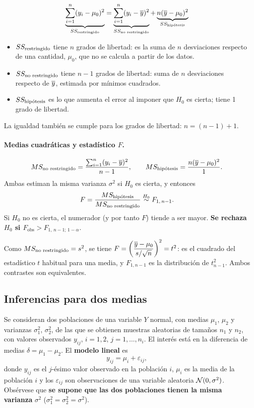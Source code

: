\begin{proposicion}
  \[
    \underbrace{\sum_{i=1}^{n} (y_i-\mu_0)^2}_{SS_{\text{restringido}}}
    = \underbrace{\sum_{i=1}^{n} (y_i-\overline{y})^2}_{SS_{\text{no restringido}}}
    + \underbrace{n(\overline{y}-\mu_0)^2}_{SS_{\text{hipótesis}}}
  \]
  \begin{itemize}
    \item $SS_{\text{restringido}}$ tiene $n$ grados de libertad: es la suma de $n$ desviaciones
      respecto de una cantidad, $\mu_0$, que no se calcula a partir de los datos.
    \item $SS_{\text{no restringido}}$ tiene $n-1$ grados de libertad: suma de $n$ desviaciones
      respecto de $\overline{y}$, estimada por mínimos cuadrados.
    \item $SS_{\text{hipótesis}}$ es lo que aumenta el error al imponer que $H_0$ es cierta; tiene
      1 grado de libertad.
  \end{itemize}
  La igualdad también se cumple para los grados de libertad: $n=(n-1)+1$.
\end{proposicion}

\paragraph{Medias cuadráticas y estadístico $F$.}
\[
  MS_{\text{no restringido}} = \frac{\sum_{i=1}^{n} (y_i-\overline{y})^2}{n-1}, \qquad
  MS_{\text{hipótesis}} = \frac{n(\overline{y}-\mu_0)^2}{1}.
\]
Ambas estiman la misma varianza $\sigma^2$ si $H_0$ es cierta, y entonces
\[
  F = \frac{MS_{\text{hipótesis}}}{MS_{\text{no restringido}}} \overset{H_0}{\sim} F_{1,\,n-1} .
\]
Si $H_0$ no es cierta, el numerador (y por tanto $F$) tiende a ser mayor. \textbf{Se rechaza
$H_0$ si $F_{\text{obs}} > F_{1,\,n-1;\,1-\alpha}$}.

\begin{nota}
  Como $MS_{\text{no restringido}}=s^2$, se tiene $F=\left(\dfrac{\overline{y}-\mu_0}{s/\sqrt{n}}\right)^2=t^2$:
  es el cuadrado del estadístico $t$ habitual para una media, y $F_{1,n-1}$ es la distribución
  de $t_{n-1}^2$. Ambos contrastes son equivalentes.
\end{nota}

\subsection{Inferencias para dos medias}
\label{sec:t1-dos-medias}

Se consideran dos poblaciones de una variable $Y$ normal, con medias $\mu_1$, $\mu_2$ y
varianzas $\sigma_1^2$, $\sigma_2^2$, de las que se obtienen muestras aleatorias de tamaños
$n_1$ y $n_2$, con valores observados $y_{ij}$, $i=1,2$, $j=1,\ldots,n_i$. El interés está en
la diferencia de medias $\delta=\mu_1-\mu_2$. El \textbf{modelo lineal} es
\[
  y_{ij} = \mu_i + \varepsilon_{ij},
\]
donde $y_{ij}$ es el $j$-ésimo valor observado en la población $i$, $\mu_i$ es la media de la
población $i$ y los $\varepsilon_{ij}$ son observaciones de una variable aleatoria
$\mathcal{N}(0,\sigma^2)$. Obsérvese que \textbf{se supone que las dos poblaciones tienen la misma
varianza} $\sigma^2$ ($\sigma_1^2=\sigma_2^2=\sigma^2$).


